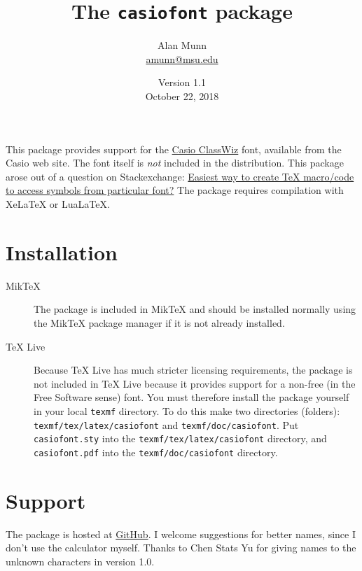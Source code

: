 \documentclass[12pt]{article}
\title{The \texttt{casiofont} package}
\author{Alan Munn\\\url{amunn@msu.edu}}
\date{Version 1.1\\October 22, 2018}
\begin{document}
\maketitle
This package provides support for the \href{https://edu.casio.com/forteachers/er/fontsets/index.php}{Casio ClassWiz} font, available from the Casio web site.  The font itself is \emph{not} included in the distribution.  This package arose out of a question on Stackexchange: \href{https://tex.stackexchange.com/q/434335/2693}{Easiest way to create TeX macro/code to access symbols from particular font?}
The package requires compilation with XeLaTeX or LuaLaTeX.
\section*{Installation}
\begin{description}
\item[MikTeX]{The package is included in MikTeX and should be installed normally using the MikTeX package manager if it is not already installed.}
\item[TeX Live]{Because TeX Live has much stricter licensing requirements, the package is not included in TeX Live because it provides support for a non-free (in the Free Software sense) font. You must therefore install the package yourself in your local \texttt{texmf} directory.  To do this make two directories (folders): \texttt{texmf/tex/latex/casiofont} and \texttt{texmf/doc/casiofont}. Put \texttt{casiofont.sty} into the \texttt{texmf/tex/latex/casiofont} directory, and \texttt{casiofont.pdf} into the \texttt{texmf/doc/casiofont} directory.}
\end{description}
\section*{Support}
The package is hosted at \href{https://github.com/amunn/casiofont}{GitHub}. I welcome suggestions for better names, since I don't use the calculator myself. Thanks to Chen Stats Yu for giving names to the unknown characters in version 1.0.

\clearpage
\end{document}

